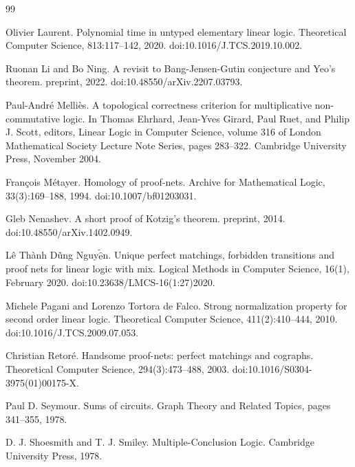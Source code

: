 \documentclass[10pt,a4paper]{amsart}
\begin{document}
\begin{thebibliography}{99}
\par\noindent  [27]  Olivier Laurent.  Polynomial time in untyped elementary linear logic.  Theoretical Computer Science, 813:117–142, 2020.  doi:10.1016/J.TCS.2019.10.002.  
 
\par\noindent  [28]  Ruonan Li and Bo Ning.  A revisit to Bang-Jensen-Gutin conjecture and Yeo’s theorem.  preprint, 2022.  doi:10.48550/arXiv.2207.03793.  
 
\par\noindent  [29]  Paul-André Melliès.  A topological correctness criterion for multiplicative non-commutative logic.  In Thomas Ehrhard, Jean-Yves Girard, Paul Ruet, and Philip J. Scott, editors, Linear Logic in Computer Science, volume 316 of London Mathematical Society Lecture Note Series, pages 283–322. Cambridge University Press, November 2004.  
 
\par\noindent  [30]  François Métayer.  Homology of proof-nets.  Archive for Mathematical Logic, 33(3):169–188, 1994.  doi:10.1007/bf01203031.  
 
\par\noindent  [31]  Gleb Nenashev.  A short proof of Kotzig’s theorem.  preprint, 2014.  doi:10.48550/arXiv.1402.0949.  
 
\par\noindent  [32]  Lê Thành Dũng Nguy$\tilde{\hat{\text{e}}}$n.  Unique perfect matchings, forbidden transitions and proof nets for linear logic with mix.  Logical Methods in Computer Science, 16(1), February 2020.  doi:10.23638/LMCS-16(1:27)2020.  
 
\par\noindent  [33]  Michele Pagani and Lorenzo Tortora de Falco.  Strong normalization property for second order linear logic.  Theoretical Computer Science, 411(2):410–444, 2010.  doi:10.1016/J.TCS.2009.07.053.  
 
\par\noindent  [34]  Christian Retoré.  Handsome proof-nets: perfect matchings and cographs.  Theoretical Computer Science, 294(3):473–488, 2003.  doi:10.1016/S0304-3975(01)00175-X.  
 
\par\noindent  [35]  Paul D. Seymour.  Sums of circuits.  Graph Theory and Related Topics, pages 341–355, 1978.  
 
\par\noindent  [36]  D. J. Shoesmith and T. J. Smiley.  Multiple-Conclusion Logic.  Cambridge University Press, 1978.  
 

\end{thebibliography}
\end{document}

